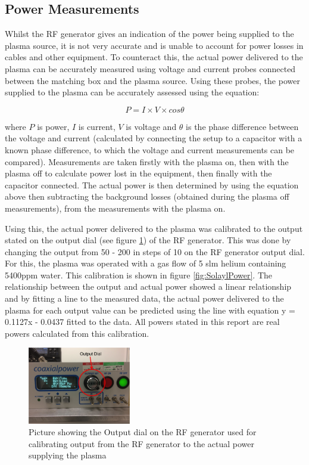 \documentclass[11pt, oneside]{article}   	%
\begin{document}
\subsection{Power Measurements}

Whilst the RF generator gives an indication of the power being supplied to the plasma source, it is not very accurate and is unable to account for power losses in cables and other equipment.
To counteract this, the actual power delivered to the plasma can be accurately measured using voltage and current probes connected between the matching box and the plasma source. 
Using these probes, the power supplied to the plasma can be accurately assessed using the equation:

\begin{equation}
P = I \times V \times cos\theta
\end{equation}

where $P$ is power, $I$ is current, $V$ is voltage and $\theta$ is the phase difference between the voltage and current (calculated by connecting the setup to a capacitor with a known phase difference, to which the voltage and current measurements can be compared).
Measurements are taken firstly with the plasma on, then with the plasma off to calculate power lost in the equipment, then finally with the capacitor connected.
The actual power is then determined by using the equation above then subtracting the background losses (obtained during the plasma off measurements), from the measurements with the plasma on.

Using this, the actual power delivered to the plasma was calibrated to the output stated on the output dial (see figure \ref{fig:OutputDial}) of the RF generator. 
This was done by changing the output from 50 - 200 in steps of 10 on the RF generator output dial.
For this, the plasma was operated with a gas flow of 5 slm helium containing 5400ppm water.
This calibration is shown in figure \ref{fig:SolaylPower}.
The relationship between the output and actual power showed a linear relationship and by fitting a line to the measured data, the actual power delivered to the plasma for each output value can be predicted using the line with equation y = 0.1127x - 0.0437 fitted to the data.
All powers stated in this report are real powers calculated from this calibration.

\begin{figure}
    \centering
    \includegraphics[width=0.4\textwidth]{Figures/OutputDial.png}
    \caption{Picture showing the Output dial on the RF generator used for calibrating output from the RF generator to the actual power supplying the plasma}
    \label{fig:OutputDial}
\end{figure}
\end{document}

